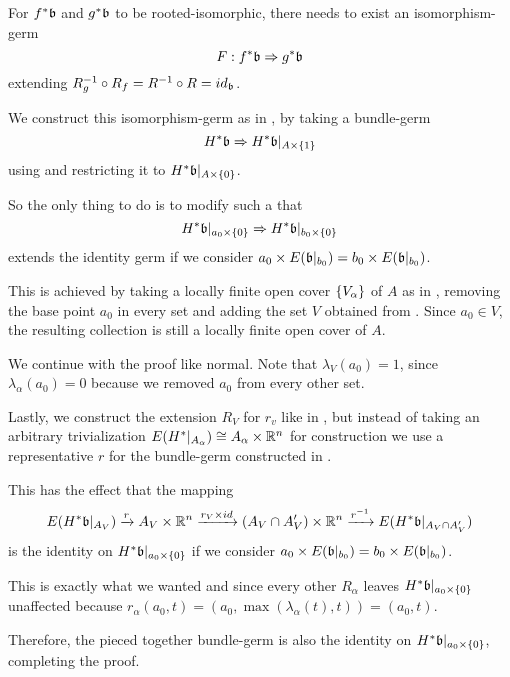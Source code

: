 \begin{myproof}
    For $\ind{f}\bb$ and $\ind{g}\bb$ to be rooted-isomorphic,
    there needs to exist an isomorphism-germ
    \[ \germdef{F}{\ind{f}\bb}{\ind{g}\bb} \]
    extending $\inv{R_g} \circ R_f = \inv{R} \circ R = id_{\bb}$.

    We construct this isomorphism-germ as in ,
    by taking a bundle-germ
    \[ \germ{\ind{H}\bb}{\ind{H}\bb[\cylup{A}]} \]
    using  and restricting it to $\ind{H}\bb[\cyldown{A}]$.

    So the only thing to do is to modify  such a that
    \[ \germ{\ind{H}\bb[\cyldown{a_0}]}{\ind{H}\bb[\cyldown{b_0}]} \]
    extends the identity germ if we consider $a_0 \cross E(\bbb) = b_0 \cross E(\bbb)$.

    This is achieved by taking a locally finite open cover $\{V_\alpha\}$
    of $A$ as in , removing the base point $a_0$ in every set
    and adding the set $V$ obtained from .
    Since $a_0 \in V$, the resulting collection is still a locally finite open cover of $A$.

    We continue with the proof like normal.
    Note that $\lambda_V(a_0) = 1$,
    since $\lambda_\alpha(a_0) = 0$ because we removed $a_0$ from every other set.

    Lastly, we construct the extension $R_V$ for $r_v$ like in ,
    but instead of taking an arbitrary trivialization $E(H^*\vert_{A_\alpha}) \cong A_\alpha \times \mathbb{R}^n$
    for construction we use a representative $r$ for the bundle-germ constructed in .
    
    This has the effect that the mapping
    \[
        E(\ind{H}\bb[A_V]) \xto{r}
        A_V \cross \R^n \xto{r_V \cross id} (A_V \cap A'_V) \cross \R^n
        \xto{\inv{r}} E(\ind{H}\bb[A_V \cap A'_V])
    \]
    is the identity on $\ind{H}\bb[\cyldown{a_0}]$ if we consider $a_0 \cross E(\bbb) = b_0 \cross E(\bbb)$.

    This is exactly what we wanted and since
    every other $R_\alpha$ leaves $\ind{H}\bb[\cyldown{a_0}]$ unaffected
    because $r_\alpha(a_0, t) = (a_0, \max(\lambda_\alpha(t), t)) = (a_0, t)$.

    Therefore, the pieced together bundle-germ
    is also the identity on $\ind{H}\bb[\cyldown{a_0}]$, completing the proof.
\end{myproof}